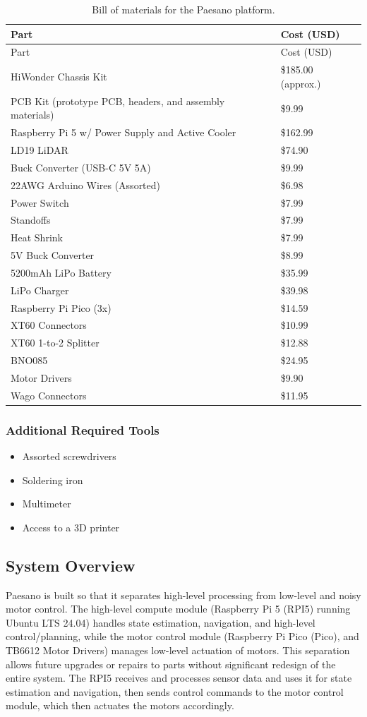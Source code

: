 \documentclass[11pt]{article}
\begin{document}
\begin{longtable}{p{} p{}}
\caption{Bill of materials for the Paesano platform.}\label{tab:bom}\\
\toprule
Part & Cost (USD) \\
\midrule
\endfirsthead
\toprule
Part & Cost (USD) \\
\midrule
\endhead
HiWonder Chassis Kit & \$185.00 (approx.) \\
PCB Kit (prototype PCB, headers, and assembly materials) & \$9.99 \\
Raspberry Pi 5 w/ Power Supply and Active Cooler & \$162.99 \\
LD19 LiDAR & \$74.90 \\
Buck Converter (USB-C 5V 5A) & \$9.99 \\
22AWG Arduino Wires (Assorted) & \$6.98 \\
Power Switch & \$7.99 \\
Standoffs & \$7.99 \\
Heat Shrink & \$7.99 \\
5V Buck Converter & \$8.99 \\
5200mAh LiPo Battery & \$35.99 \\
LiPo Charger & \$39.98 \\
Raspberry Pi Pico (3x) & \$14.59 \\
XT60 Connectors & \$10.99 \\
XT60 1-to-2 Splitter & \$12.88 \\
BNO085 & \$24.95 \\
Motor Drivers & \$9.90 \\
Wago Connectors & \$11.95 \\
\bottomrule
\end{longtable}

\subsubsection{Additional Required Tools}
\begin{itemize}
    \item Assorted screwdrivers
    \item Soldering iron
    \item Multimeter
    \item Access to a 3D printer
\end{itemize}

\subsection{System Overview}
Paesano is built so that it separates high-level processing from low-level and noisy motor control. 
  The high-level compute module (Raspberry Pi 5 (RPI5) running Ubuntu LTS 24.04) handles state estimation, navigation, and high-level control/planning, 
  while the motor control module (Raspberry Pi Pico (Pico), and TB6612 Motor Drivers) manages low-level actuation 
  of motors. This separation allows future upgrades or repairs to parts without 
  significant redesign of the entire system. The RPI5 receives and processes sensor data and uses it for 
  state estimation and navigation, then sends control commands to the motor control module, which then actuates the 
  motors accordingly.
\end{document}
